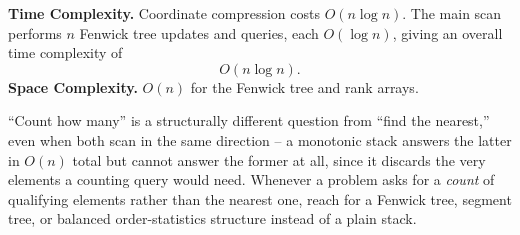 \begin{complexitybox}
\textbf{Time Complexity.} Coordinate compression costs $O(n \log n)$. The
main scan performs $n$ Fenwick tree updates and queries, each
$O(\log n)$, giving an overall time complexity of
\[
  O(n \log n).
\]
\textbf{Space Complexity.} $O(n)$ for the Fenwick tree and rank arrays.
\end{complexitybox}

\begin{takeawaybox}
``Count how many'' is a structurally different question from ``find the
nearest,'' even when both scan in the same direction -- a monotonic stack
answers the latter in $O(n)$ total but cannot answer the former at all,
since it discards the very elements a counting query would need. Whenever
a problem asks for a \emph{count} of qualifying elements rather than the
nearest one, reach for a Fenwick tree, segment tree, or balanced
order-statistics structure instead of a plain stack.
\end{takeawaybox}
